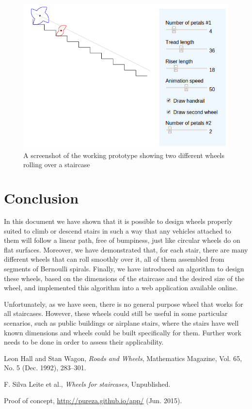 \documentclass{article}
\theoremstyle{theorem}
\theoremstyle{theorem}
\begin{document}
\begin{figure}[h]
  \centering
  \includegraphics[width=.9\linewidth]{fig-prototype.png}
  \caption{A screenshot of the working prototype showing two different
    wheels rolling over a staircase}
  \label{fig:prototype}
\end{figure}


\section{Conclusion}

In this document we have shown that it is possible to design wheels
properly suited to climb or descend stairs in such a way that any
vehicles attached to them will follow a linear path, free of
bumpiness, just like circular wheels do on flat surfaces. Moreover, we
have demonstrated that, for each stair, there are many different
wheels that can roll smoothly over it, all of them assembled from
segments of Bernoulli spirals. Finally, we have introduced an
algorithm to design these wheels, based on the dimensions of the
staircase and the desired size of the wheel, and implemented this
algorithm into a web application available online.

Unfortunately, as we have seen, there is no general purpose wheel that
works for all staircases. However, these wheels could still be useful
in some particular scenarios, such as public buildings or airplane
stairs, where the stairs have well known dimensions and wheels could
be built specifically for them. Further work needs to be done in order
to assess their applicability.

\begin{thebibliography}{10}

Leon Hall and Stan Wagon, {\it Roads and Wheels},
  Mathematics Magazine, Vol. 65, No. 5 (Dec. 1992), 283--301.

F. Silva Leite et al., {\it Wheels for staircases},
  Unpublished.

Proof of concept,
  \url{http://pureza.github.io/app/} (Jun. 2015).

\end{thebibliography}
\end{document}
